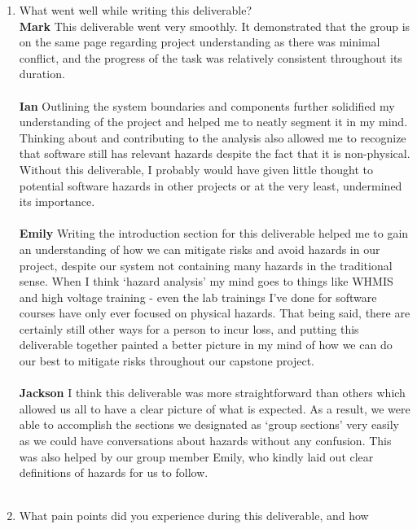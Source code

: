 \documentclass{article}
\begin{document}


\begin{enumerate}
    \item What went well while writing this deliverable? \\
    \textbf{Mark} This deliverable went very smoothly. It demonstrated that the group is on the same page regarding project understanding as there was minimal conflict, and the progress of the task was relatively consistent throughout its duration. \\ \\
    \textbf{Ian} Outlining the system boundaries and components further solidified my 
    understanding of the project and helped me to neatly segment it in my mind. Thinking 
    about and contributing to the analysis also allowed me to recognize that software 
    still has relevant hazards despite the fact that it is non-physical. Without this 
    deliverable, I probably would have given little thought to potential software hazards 
    in other projects or at the very least, undermined its importance.\\ \\
    \textbf{Emily} Writing the introduction section for this deliverable helped me to gain 
    an understanding of how we can mitigate risks and avoid hazards in our project, despite 
    our system not containing many hazards in the traditional sense. When I think ‘hazard 
    analysis’ my mind goes to things like WHMIS and high voltage training - even the lab 
    trainings I’ve done for software courses have only ever focused on physical hazards. 
    That being said, there are certainly still other ways for a person to incur loss, and 
    putting this deliverable together painted a better picture in my mind of how we can do 
    our best to mitigate risks throughout our capstone project. \\ \\
    \textbf{Jackson} I think this deliverable was more straightforward than others which allowed 
    us all to have a clear picture of what is expected. As a result, we were able to accomplish the 
    sections we designated as ‘group sections’ very easily as we could have conversations about hazards 
    without any confusion. This was also helped by our group member Emily, who kindly laid out clear definitions 
    of hazards for us to follow.\\ \\
    \item What pain points did you experience during this deliverable, and how

\end{enumerate}
\end{document}
